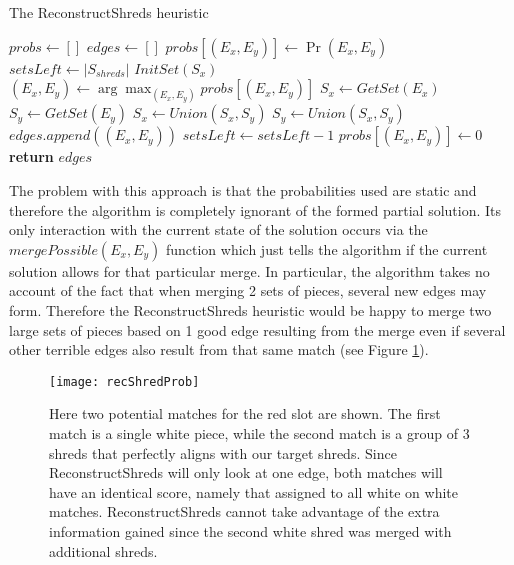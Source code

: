 \begin{algorithm}[h]
\caption{The ReconstructShreds heuristic}
\begin{algorithmic}[1]
\Statex {} 
  \State $probs \gets []$ 
  \State $edges \gets []$ 
      \State $probs[(E_x,E_y)] \gets \Pr(E_x,E_y)$ 
    \EndFor
  \EndFor
  \Statex
  \State $setsLeft \gets |S_{shreds}|$  
    \State $InitSet(S_x)$
  \EndFor
  \Statex
   
    \State $(E_x,E_y) \gets \arg\max_{(E_x,E_y)} probs[(E_x,E_y)]$ 
    \State $S_x \gets GetSet(E_x)$  
    \State $S_y \gets GetSet(E_y)$
      \State $S_x \gets Union(S_x,S_y)$ 
      \State $S_y \gets Union(S_x,S_y)$
      \State $edges.append((E_x,E_y))$
      \State $setsLeft \gets setsLeft - 1$  
    \EndIf
    \State $probs[(E_x,E_y)] \gets 0$  
  \EndWhile
  \Statex
  \State \textbf{return} $edges$  
\EndProcedure
\end{algorithmic}
\label{alg:RS}
\end{algorithm}

The problem with this approach is that the probabilities used are static and therefore the algorithm is completely ignorant of the formed partial solution. Its only interaction with the current state of the solution occurs via the $mergePossible(E_x,E_y)$ function which just tells the algorithm if the current solution allows for that particular merge. In particular, the algorithm takes no account of the fact that when merging 2 sets of pieces, several new edges may form. Therefore the ReconstructShreds heuristic would be happy to merge two large sets of pieces based on 1 good edge resulting from the merge even if several other terrible edges also result from that same match (see Figure \ref{fig:rsp}).

\begin{figure}[h]
    \centering
    \texttt{[image: recShredProb]}
    \caption{Here two potential matches for the red slot are shown. The first match is a single white piece, while the second match is a group of 3 shreds that perfectly aligns with our target shreds. Since ReconstructShreds will only look at one edge, both matches will have an identical score, namely that assigned to all white on white matches. ReconstructShreds cannot take advantage of the extra information gained since the second white shred was merged with additional shreds.}
    \label{fig:rsp}
\end{figure}


